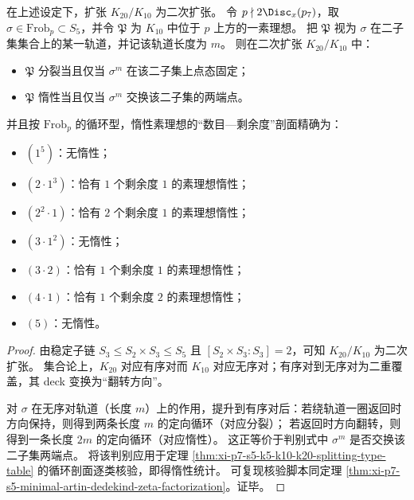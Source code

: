 \begin{theorem}\label{thm:xi-p7-s5-k20-over-k10-oriented-flip-inertia-profile}
在上述设定下，扩张 \(K_{20}/K_{10}\) 为二次扩张。
令 \(p\nmid 2\Disc_x(p_7)\)，取 \(\sigma\in \mathrm{Frob}_p\subset S_5\)，并令 \(\mathfrak P\) 为 \(K_{10}\) 中位于 \(p\) 上方的一素理想。
把 \(\mathfrak P\) 视为 \(\sigma\) 在二子集集合上的某一轨道，并记该轨道长度为 \(m\)。
则在二次扩张 \(K_{20}/K_{10}\) 中：
\begin{itemize}
  \item \(\mathfrak P\) 分裂当且仅当 \(\sigma^{m}\) 在该二子集上点态固定；
  \item \(\mathfrak P\) 惰性当且仅当 \(\sigma^{m}\) 交换该二子集的两端点。
\end{itemize}
并且按 \(\mathrm{Frob}_p\) 的循环型，惰性素理想的“数目—剩余度”剖面精确为：
\begin{itemize}
  \item \((1^5)\)：无惰性；
  \item \((2\cdot 1^3)\)：恰有 \(1\) 个剩余度 \(1\) 的素理想惰性；
  \item \((2^2\cdot 1)\)：恰有 \(2\) 个剩余度 \(1\) 的素理想惰性；
  \item \((3\cdot 1^2)\)：无惰性；
  \item \((3\cdot 2)\)：恰有 \(1\) 个剩余度 \(1\) 的素理想惰性；
  \item \((4\cdot 1)\)：恰有 \(1\) 个剩余度 \(2\) 的素理想惰性；
  \item \((5)\)：无惰性。
\end{itemize}
\end{theorem}
\begin{proof}
由稳定子链 \(S_3\le S_2\times S_3\le S_5\) 且 \([S_2\times S_3:S_3]=2\)，可知 \(K_{20}/K_{10}\) 为二次扩张。
集合论上，\(K_{20}\) 对应有序对而 \(K_{10}\) 对应无序对；有序对到无序对为二重覆盖，其 deck 变换为“翻转方向”。
\par
对 \(\sigma\) 在无序对轨道（长度 \(m\)）上的作用，提升到有序对后：若绕轨道一圈返回时方向保持，则得到两条长度 \(m\) 的定向循环（对应分裂）；
若返回时方向翻转，则得到一条长度 \(2m\) 的定向循环（对应惰性）。
这正等价于判别式中 \(\sigma^m\) 是否交换该二子集两端点。
将该判别应用于定理 \ref{thm:xi-p7-s5-k5-k10-k20-splitting-type-table} 的循环剖面逐类核验，即得惰性统计。
可复现核验脚本同定理 \ref{thm:xi-p7-s5-minimal-artin-dedekind-zeta-factorization}。证毕。
\end{proof}

